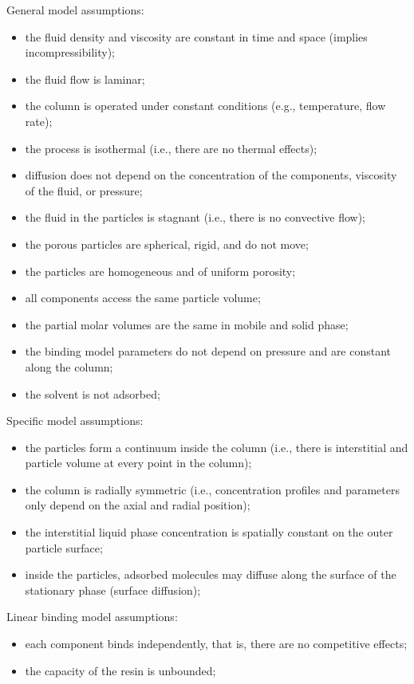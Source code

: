 \documentclass{article}
\begin{document}
General model assumptions:
\begin{itemize}
    \item the fluid density and viscosity are constant in time and space (implies incompressibility);
    \item the fluid flow is laminar;
    \item the column is operated under constant conditions (e.g., temperature, flow rate);
    \item the process is isothermal (i.e., there are no thermal effects);
    \item diffusion does not depend on the concentration of the components, viscosity of the fluid, or pressure;
    \item the fluid in the particles is stagnant (i.e., there is no convective flow);
    \item the porous particles are spherical, rigid, and do not move;
    \item the particles are homogeneous and of uniform porosity;
    \item all components access the same particle volume;
    \item the partial molar volumes are the same in mobile and solid phase;
    \item the binding model parameters do not depend on pressure and are constant along the column;
    \item the solvent is not adsorbed;
\end{itemize}

Specific model assumptions:
\begin{itemize}
    \item the particles form a continuum inside the column (i.e., there is interstitial and particle volume at every point in the column);
    \item the column is radially symmetric (i.e., concentration profiles and parameters only depend on the axial and radial position);
    \item the interstitial liquid phase concentration is spatially constant on the outer particle surface;
    \item inside the particles, adsorbed molecules may diffuse along the surface of the stationary phase (surface diffusion);
\end{itemize}

Linear binding model assumptions:
\begin{itemize}
    \item each component binds independently, that is, there are no competitive effects;
    \item the capacity of the resin is unbounded;
\end{itemize}
\end{document}
